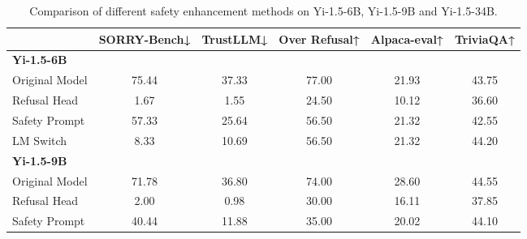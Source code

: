 \begin{table*}[h]
\caption{Comparison of different safety enhancement methods on Yi-1.5-6B, Yi-1.5-9B and Yi-1.5-34B.}\label{table:app_result}
\vspace{2mm}
\centering
\renewcommand{\arraystretch}{1.1}
\begin{tabular}{lccccc}
\hline
\textbf{}           & \multicolumn{1}{l}{SORRY-Bench↓} & \multicolumn{1}{l}{TrustLLM↓} & \multicolumn{1}{l}{Over Refusal↑} & \multicolumn{1}{l}{Alpaca-eval↑} & \multicolumn{1}{l}{TriviaQA↑} \\ \hline\hline
\textbf{Yi-1.5-6B}  & \multicolumn{1}{l}{}             & \multicolumn{1}{l}{}          & \multicolumn{1}{l}{}              & \multicolumn{1}{l}{}             & \multicolumn{1}{l}{}          \\
Original Model      & 75.44                            & 37.33                         & 77.00                             & 21.93                            & 43.75                         \\
Refusal Head      & 1.67                             & 1.55                          & 24.50                             & 10.12                            & 36.60                         \\
Safety Prompt      & 57.33                            & 25.64                         & 56.50                             & 21.32                            & 42.55                         \\
LM Switch          & 8.33                             & 10.69                         & 56.50                             & 21.32                            & 44.20                         \\ \hline
\textbf{Yi-1.5-9B}  &                                  &                               &                                   &                                  &                               \\
Original Model      & 71.78                            & 36.80                         & 74.00                             & 28.60                            & 44.55                         \\
Refusal Head      & 2.00                             & 0.98                          & 30.00                             & 16.11                            & 37.85                         \\
Safety Prompt      & 40.44                            & 11.88                         & 35.00                             & 20.02                            & 44.10                         \\

\end{tabular}
\end{table*}
